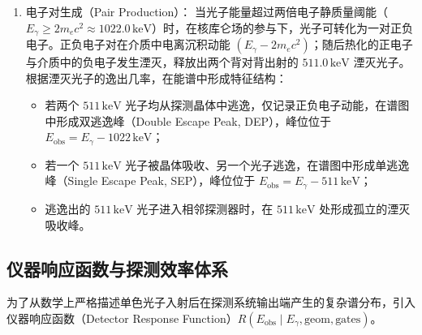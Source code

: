 \begin{enumerate}
\item 电子对生成（Pair Production）：
当光子能量超过两倍电子静质量阈能（$E_\gamma \ge 2 m_e c^2 \approx 1022.0\,\text{keV}$）时，在核库仑场的参与下，光子可转化为一对正负电子。正负电子对在介质中电离沉积动能 $(E_\gamma - 2 m_e c^2)$；随后热化的正电子与介质中的负电子发生湮灭，释放出两个背对背出射的 $511.0\,\text{keV}$ 湮灭光子。根据湮灭光子的逸出几率，在能谱中形成特征结构：
\begin{itemize}
\item 若两个 $511\,\text{keV}$ 光子均从探测晶体中逃逸，仅记录正负电子动能，在谱图中形成双逃逸峰（Double Escape Peak, DEP），峰位位于 $E_{\mathrm{obs}} = E_\gamma - 1022\,\text{keV}$；
\item 若一个 $511\,\text{keV}$ 光子被晶体吸收、另一个光子逃逸，在谱图中形成单逃逸峰（Single Escape Peak, SEP），峰位位于 $E_{\mathrm{obs}} = E_\gamma - 511\,\text{keV}$；
\item 逃逸出的 $511\,\text{keV}$ 光子进入相邻探测器时，在 $511\,\text{keV}$ 处形成孤立的湮灭吸收峰。
\end{itemize}
\end{enumerate}

\subsection{仪器响应函数与探测效率体系}\label{subsec:5-2-2}

为了从数学上严格描述单色光子入射后在探测系统输出端产生的复杂谱分布，引入仪器响应函数（Detector Response Function）$R(E_{\mathrm{obs}} \mid E_\gamma, \text{geom}, \text{gates})$。

